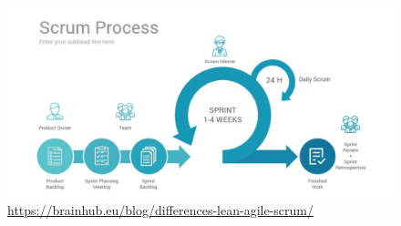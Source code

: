 \documentclass[a4paper, 10pt]{scrartcl}
\begin{document}
\begin{figure}[H]
	\centering
	\includegraphics[width=\textwidth]{Bilder/Scrum.png}
	\caption{\url{https://brainhub.eu/blog/differences-lean-agile-scrum/}}
\end{figure}
\end{document}
